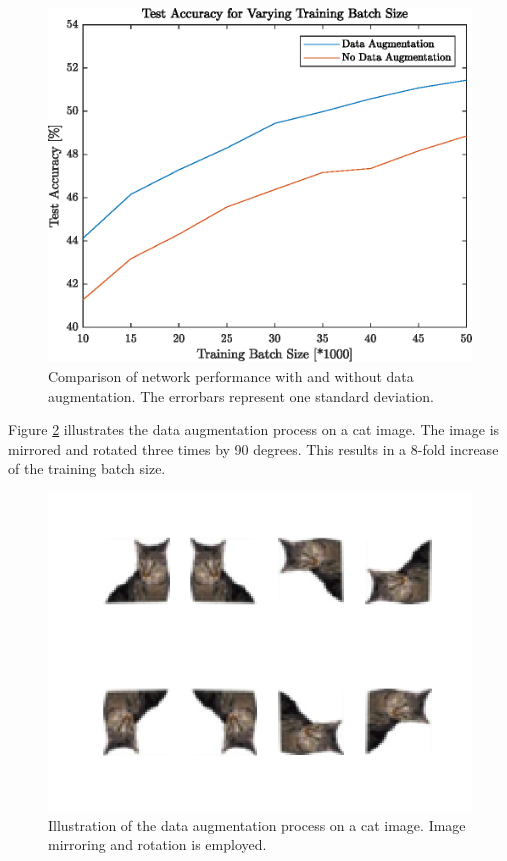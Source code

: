    	\begin{figure}[h!]
		\centering
   	  	\includegraphics{images/dataAugmentation}
   	  	\caption{Comparison of network performance with and without data augmentation. The errorbars represent one standard deviation.}
   	  	\label{fig:dataAugmentation}
   	\end{figure}

Figure \ref{fig:dataAugDemo} illustrates the data augmentation process on a cat image. The image is mirrored and rotated three times by 90 degrees. This results in a 8-fold increase of the training batch size.

   	\begin{figure}[h!]
   		\centering
   		\includegraphics{images/DataAugDemo.png}
   		\caption{Illustration of the data augmentation process on a cat image. Image mirroring and rotation is employed.}
   		\label{fig:dataAugDemo}
   	\end{figure}


